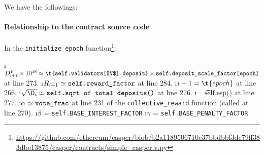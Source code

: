 \begin{lemma}
We have the followings:
\end{lemma}

\paragraph{Relationship to the contract source code}

In the \verb|initialize_epoch| function\footnote{\url{https://github.com/ethereum/casper/blob/b2a1189506710c37bbdbbf3dc79ff383dbe13875/casper/contracts/simple_casper.v.py}}:
\begin{itemize}
\i $D^V_{i+1} \times 10^{18} \simeq \t{self.validators[$V$].deposit} \times \verb|self.deposit_scale_factor[epoch]|$ at line 273.
\i $R_{i+1} \simeq \verb|self.reward_factor|$ at line 284.
\i $i + 1 = \t{epoch}$ at line 266.
\i $\sqrt{\D_{i}} \simeq \verb|self.sqrt_of_total_deposits()|$ at line 276.
\i \ESF = \t{self.esp()} at line 277.
\i $\alpha \simeq \verb|vote_frac|$ at line 231 of the \verb|collective_reward| function (called at line 270).
\i $\beta$ = \verb|self.BASE_INTEREST_FACTOR|
\i $\gamma$ = \verb|self.BASE_PENALTY_FACTOR|
\end{itemize}
